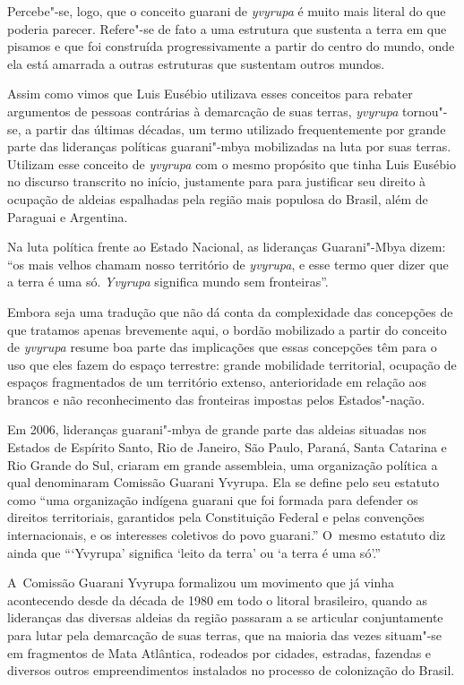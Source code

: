 Percebe"-se, logo, que o conceito guarani de \emph{yvyrupa} é muito mais literal
do que poderia parecer. Refere"-se de fato a uma estrutura que sustenta
a terra em que pisamos e que foi construída progressivamente a partir
do centro do mundo, onde ela está amarrada a outras estruturas que
sustentam outros mundos.

Assim como vimos que Luis Eusébio utilizava esses conceitos para rebater
argumentos de pessoas contrárias à demarcação de suas terras, \emph{yvyrupa}
tornou"-se, a partir das últimas décadas, um termo utilizado
frequentemente por grande parte das lideranças políticas guarani"-mbya
mobilizadas na luta por suas terras. Utilizam esse conceito de \emph{yvyrupa}
com o mesmo propósito que tinha Luis Eusébio no discurso transcrito no 
início, justamente para para justificar seu direito à ocupação de
aldeias espalhadas pela região mais populosa do Brasil, além de
Paraguai e Argentina.

Na luta política frente ao Estado Nacional, as lideranças Guarani"-Mbya
dizem: ``os mais velhos chamam nosso território de \emph{yvyrupa}, e esse termo
quer dizer que a terra é uma só. \emph{Yvyrupa} significa mundo sem
fronteiras''.

Embora seja uma tradução que não dá conta da complexidade das concepções
de que tratamos apenas brevemente aqui, o bordão mobilizado a partir do
conceito de \emph{yvyrupa} resume boa parte das implicações que essas
concepções têm para o uso que eles fazem do espaço terrestre: grande
mobilidade territorial, ocupação de espaços fragmentados de um
território extenso, anterioridade em relação aos brancos e não
reconhecimento das fronteiras impostas pelos Estados"-nação.

Em 2006, lideranças guarani"-mbya de grande parte das aldeias situadas
nos Estados de Espírito Santo, Rio de Janeiro, São Paulo, Paraná, Santa
Catarina e Rio Grande do Sul, criaram em grande assembleia, uma
organização política a qual denominaram Comissão Guarani Yvyrupa. Ela
se define pelo seu estatuto como ``uma organização indígena guarani que
foi formada para defender os direitos territoriais, garantidos pela
Constituição Federal e pelas convenções internacionais, e os interesses
coletivos do povo guarani.'' O~mesmo estatuto diz ainda que ``‘Yvyrupa’ 
significa ‘leito da terra’ ou ‘a terra é uma só’.''

A~Comissão Guarani Yvyrupa formalizou um movimento que já vinha
acontecendo desde da década de 1980 em todo o litoral brasileiro,
quando as lideranças das diversas aldeias da região passaram a se
articular conjuntamente para lutar pela demarcação de suas terras, que
na maioria das vezes situam"-se em fragmentos de Mata Atlântica,
rodeados por cidades, estradas, fazendas e diversos outros
empreendimentos instalados no processo de colonização do Brasil.

